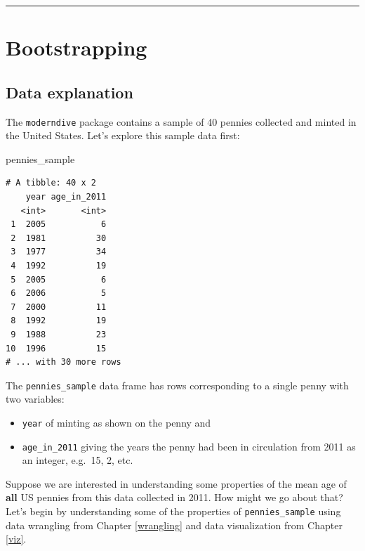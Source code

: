 \documentclass[12pt, krantz2,]{krantz}
\makeatletter
\newenvironment{Shaded}{\begin{snugshade}}{\end{snugshade}}
\newcommand{\NormalTok}[1]{#1}
\providecommand{\tightlist}{%
  \setlength{\itemsep}{0pt}\setlength{\parskip}{0pt}}
\newenvironment{kframe}{%
\medskip{}
\setlength{\fboxsep}{.8em}
 \def\at@end@of@kframe{}%
 \ifinner\ifhmode%
  \def\at@end@of@kframe{\end{minipage}}%
  \begin{minipage}{\columnwidth}%
 \fi\fi%
 \def\FrameCommand##1{\hskip\@totalleftmargin \hskip-\fboxsep
 \colorbox{shadecolor}{##1}\hskip-\fboxsep
     \hskip-\linewidth \hskip-\@totalleftmargin \hskip\columnwidth}%
 \MakeFramed {\advance\hsize-\width
   \@totalleftmargin\z@ \linewidth\hsize
   \@setminipage}}%
 {\par\unskip\endMakeFramed%
 \at@end@of@kframe}
\renewenvironment{Shaded}{\begin{kframe}}{\end{kframe}}
\makeatother
\begin{document}
\begin{center}\rule{0.5\linewidth}{\linethickness}\end{center}

\hypertarget{bootstrapping}{%
\section{Bootstrapping}\label{bootstrapping}}

\hypertarget{data-explanation}{%
\subsection{Data explanation}\label{data-explanation}}

The \texttt{moderndive} package contains a sample of 40 pennies collected and minted in the United States. Let's explore this sample data first:

\begin{Shaded}
\begin{Highlighting}[]
\NormalTok{pennies_sample}
\end{Highlighting}
\end{Shaded}

\begin{verbatim}
# A tibble: 40 x 2
    year age_in_2011
   <int>       <int>
 1  2005           6
 2  1981          30
 3  1977          34
 4  1992          19
 5  2005           6
 6  2006           5
 7  2000          11
 8  1992          19
 9  1988          23
10  1996          15
# ... with 30 more rows
\end{verbatim}

The \texttt{pennies\_sample} data frame has rows corresponding to a single penny with two variables:

\begin{itemize}
\tightlist
\item
  \texttt{year} of minting as shown on the penny and
\item
  \texttt{age\_in\_2011} giving the years the penny had been in circulation from 2011 as an integer, e.g.~15, 2, etc.
\end{itemize}

Suppose we are interested in understanding some properties of the mean age of \textbf{all} US pennies from this data collected in 2011. How might we go about that? Let's begin by understanding some of the properties of \texttt{pennies\_sample} using data wrangling from Chapter \ref{wrangling} and data visualization from Chapter \ref{viz}.
\end{document}
